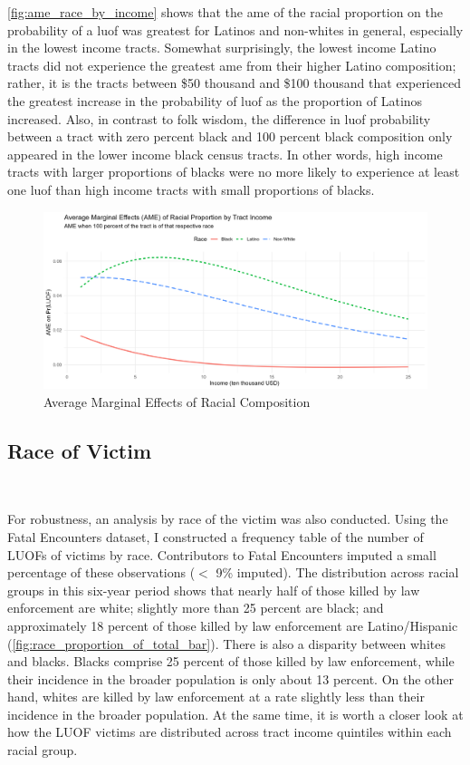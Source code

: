 \documentclass[12pt]{article}
\begin{document}
\autoref{fig:ame_race_by_income} shows that the \gls{ame} of the racial proportion on the probability of a \acrshort{luof} was greatest for Latinos and non-whites in general, especially in the lowest income tracts. Somewhat surprisingly, the lowest income Latino tracts did not experience the greatest \acrshort{ame} from their higher Latino composition; rather, it is the tracts between \$50 thousand and \$100 thousand that experienced the greatest increase in the probability of \acrshort{luof} as the proportion of Latinos increased. Also, in contrast to folk wisdom, the difference in \acrshort{luof} probability between a tract with zero percent black and 100 percent black composition only appeared in the lower income black census tracts. In other words, high income tracts with larger proportions of blacks were no more likely to experience at least one \acrshort{luof} than high income tracts with small proportions of blacks.

\begin{figure}[H]
  \centering
  \includegraphics[width=\linewidth]{images/ame_race_by_income}
  \captionsetup{justification=centering, singlelinecheck=false, margin=2cm}
  \caption{Average Marginal Effects of Racial Composition}
  \label{fig:ame_race_by_income}
\end{figure}

\subsection{Race of Victim}\

For robustness, an analysis by race of the victim was also conducted. Using the Fatal Encounters dataset, I constructed a frequency table of the number of LUOFs of victims by race. Contributors to Fatal Encounters imputed a small percentage of these observations ($<$ 9\% imputed). The distribution across racial groups in this six-year period shows that nearly half of those killed by law enforcement are white; slightly more than 25 percent are black; and approximately 18 percent of those killed by law enforcement are Latino/Hispanic (\autoref{fig:race_proportion_of_total_bar}). There is also a disparity between whites and blacks. Blacks comprise 25 percent of those killed by law enforcement, while their incidence in the broader population is only about 13 percent. On the other hand, whites are killed by law enforcement at a rate slightly less than their incidence in the broader population. At the same time, it is worth a closer look at how the LUOF victims are distributed across tract income quintiles within each racial group.
\end{document}
